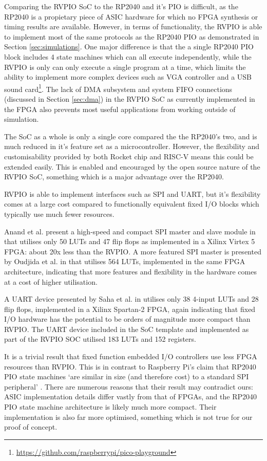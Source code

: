 Comparing the RVPIO SoC to the RP2040 and it's PIO is difficult, as the RP2040 is a propietary piece of ASIC hardware for which no FPGA synthesis or timing results are available. However, in terms of functionality, the RVPIO is able to implement most of the same protocols as the RP2040 PIO as demonstrated in Section \ref{sec:simulations}. One major difference is that the a single RP2040 PIO block includes 4 state machines which can all execute independently, while the RVPIO is only can only execute a single program at a time, which limits the ability to implement more complex devices such as VGA controller and a USB sound card\footnote{\url{https://github.com/raspberrypi/pico-playground}}. The lack of DMA subsystem and system FIFO connections (discussed in Section \ref{sec:dma}) in the RVPIO SoC as currently implemented in the FPGA also prevents most useful applications from working outside of simulation.

The SoC as a whole is only a single core compared the the RP2040's two, and is much reduced in it's feature set as a microcontroller. However, the flexibility and customisability provided by both Rocket chip and RISC-V means this could be extended easily. This is enabled and encouraged by the open source nature of the RVPIO SoC, something which is a major advantage over the RP2040.

RVPIO is able to implement interfaces such as SPI and UART, but it's flexibility comes at a large cost compared to functionally equivalent fixed I/O blocks which typically use much fewer resources.

Anand et al. present a high-speed and compact SPI master and slave module in \cite{spi-device} that utilises only 50 LUTs and 47 flip flops as implemented in a Xilinx Virtex 5 FPGA: about 20x less than the RVPIO. A more featured SPI master is presented by Oudjida et al. in \cite{spi-i2c} that utilises 564 LUTs, implemented in the same FPGA architecture, indicating that more features and flexibility in the hardware comes at a cost of higher utilisation.

A UART device presented by Saha et al. in \cite{uart-device} utilises only 38 4-input LUTs and 28 flip flops, implemented in a Xilinx Spartan-2 FPGA, again indicating that fixed I/O hardware has the potential to be orders of magnitude more compact than RVPIO. The UART device included in the SoC template and implemented as part of the RVPIO SOC utilised 183 LUTs and 152 registers.

It is a trivial result that fixed function embedded I/O controllers use less FPGA resources than RVPIO. This is in contrast to Raspberry Pi's claim that RP2040 PIO state machines `are similar in size (and therefore cost) to a standard SPI peripheral' \cite{picosdk}. There are numerous reasons that their result may contradict ours: ASIC implementation details differ vastly from that of FPGAs, and the RP2040 PIO state machine architecture is likely much more compact. Their implementation is also far more optimised, something which is not true for our proof of concept.

